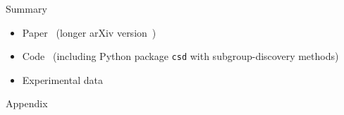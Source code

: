 \documentclass[en, navbaroff, handout]{sdqbeamer}
\begin{document}
\begin{frame}[t]{Summary}
\begin{itemize}
		\begin{itemize}
			\item Paper~\cite{bach2025subgroup} (longer arXiv version~\cite{bach2025using})
			\item Code~\cite{bach2025constrained} (including Python package \texttt{csd} with subgroup-discovery methods)
			\item Experimental data~\cite{bach2025experimental}
		\end{itemize}
	\end{itemize}
\end{frame}

\appendix
\beginbackup %

\begin{frame}[plain]
	\centering
	\Huge Appendix
\end{frame}
\end{document}
